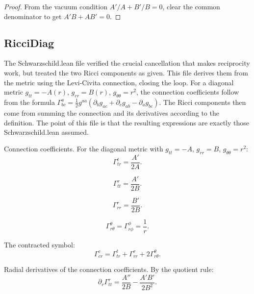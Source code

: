 \begin{proof}
From the vacuum condition $A'/A + B'/B = 0$, clear the common denominator to get $A'B + AB' = 0$.
\end{proof}

\subsection{RicciDiag}

The Schwarzschild.lean file verified the crucial cancellation that makes reciprocity work, but treated the two Ricci components as given. This file derives them from the metric using the Levi-Civita connection, closing the loop. For a diagonal metric $g_{tt} = -A(r)$, $g_{rr} = B(r)$, $g_{\theta\theta} = r^2$, the connection coefficients follow from the formula $\Gamma^a_{bc} = \frac{1}{2}g^{aa}(\partial_b g_{ac} + \partial_c g_{ab} - \partial_a g_{bc})$. The Ricci components then come from summing the connection and its derivatives according to the definition. The point of this file is that the resulting expressions are exactly those Schwarzschild.lean assumed.

\begin{definition}
Connection coefficients. For the diagonal metric with $g_{tt} = -A$, $g_{rr} = B$, $g_{\theta\theta} = r^2$:
$$\Gamma^t_{tr} = \frac{A'}{2A}.$$
\end{definition}

\begin{definition}
$$\Gamma^r_{tt} = \frac{A'}{2B}.$$
\end{definition}

\begin{definition}
$$\Gamma^r_{rr} = \frac{B'}{2B}.$$
\end{definition}

\begin{definition}
$$\Gamma^\theta_{r\theta} = \Gamma^\phi_{r\phi} = \frac{1}{r}.$$
\end{definition}

\begin{definition}
The contracted symbol:
$$\Gamma^c_{cr} = \Gamma^t_{tr} + \Gamma^r_{rr} + 2\Gamma^\theta_{r\theta}.$$
\end{definition}

\begin{definition}
Radial derivatives of the connection coefficients. By the quotient rule:
$$\partial_r \Gamma^r_{tt} = \frac{A''}{2B} - \frac{A'B'}{2B^2}.$$
\end{definition}

